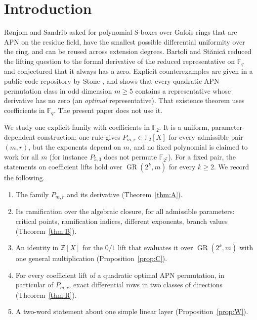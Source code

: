 \documentclass[preprint,12pt]{elsarticle}
\theoremstyle{definition}
\newcommand{\F}{\mathbb{F}}
\newcommand{\Z}{\mathbb{Z}}
\newcommand{\GR}{\operatorname{GR}}
\begin{document}
\section{Introduction}
R{\o}njom and Sandrib \cite{RS} asked for polynomial S-boxes over Galois rings that are APN on the residue field, have the smallest possible differential uniformity over the ring, and can be reused across extension degrees. Bartoli and St\u{a}nic\u{a} \cite{BS} reduced the lifting question to the formal derivative of the reduced representative on $\F_q$ and conjectured that it always has a zero. Explicit counterexamples are given in a public code repository by Stone \cite{Stone}, and \cite{TIT} shows that every quadratic APN permutation class in odd dimension $m\ge5$ contains a representative whose derivative has no zero (an \emph{optimal} representative). That existence theorem uses coefficients in $\F_q$. The present paper does not use it.

We study one explicit family with coefficients in $\F_2$. It is a uniform, parameter-dependent construction: one rule gives $P_{m,r}\in\F_2[X]$ for every admissible pair $(m,r)$, but the exponents depend on $m$, and no fixed polynomial is claimed to work for all $m$ (for instance $P_{5,3}$ does not permute $\F_{2^7}$). For a fixed pair, the statements on coefficient lifts hold over $\GR(2^k,m)$ for every $k\ge2$. We record the following.
\begin{enumerate}
\item[(A)] The family $P_{m,r}$ and its derivative (Theorem~\ref{thm:A}).
\item[(B)] Its ramification over the algebraic closure, for all admissible parameters: critical points, ramification indices, different exponents, branch values (Theorem~\ref{thm:B}).
\item[(C)] An identity in $\Z[X]$ for the $0/1$ lift that evaluates it over $\GR(2^k,m)$ with one general multiplication (Proposition~\ref{prop:C}).
\item[(R)] For every coefficient lift of a quadratic optimal APN permutation, in particular of $P_{m,r}$, exact differential rows in two classes of directions (Theorem~\ref{thm:R}).
\item[(W)] A two-word statement about one simple linear layer (Proposition~\ref{prop:W}).
\end{enumerate}
\end{document}

